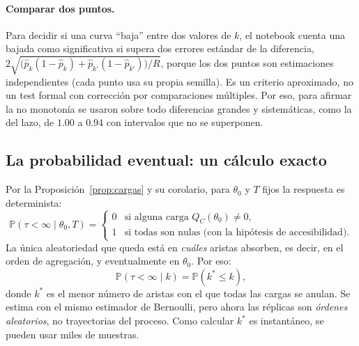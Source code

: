 \documentclass[11pt,a4paper]{article}
\theoremstyle{plain}
\theoremstyle{remark}
\begin{document}
\paragraph{Comparar dos puntos.} Para decidir si una curva ``baja'' entre dos valores de $k$, el notebook cuenta una bajada como significativa si supera dos errores estándar de la diferencia, $2\sqrt{\big(\hat p_k(1-\hat p_k)+\hat p_{k'}(1-\hat p_{k'})\big)/R}$, porque los dos puntos son estimaciones independientes (cada punto usa su propia semilla). Es un criterio aproximado, no un test formal con corrección por comparaciones múltiples. Por eso, para afirmar la no monotonía se usaron sobre todo diferencias grandes y sistemáticas, como la del lazo, de $1.00$ a $0.94$ con intervalos que no se superponen.

\subsection{La probabilidad eventual: un cálculo exacto}\label{sec:fund-exacta}

Por la Proposición~\ref{prop:cargas} y su corolario, para $\theta_0$ y $T$ fijos la respuesta es determinista:
\[
\mathbb{P}(\tau<\infty\mid\theta_0,T)=\begin{cases}0&\text{si alguna carga }Q_C(\theta_0)\ne0,\\1&\text{si todas son nulas (con la hipótesis de accesibilidad).}\end{cases}
\]
La única aleatoriedad que queda está en \emph{cuáles} aristas absorben, es decir, en el orden de agregación, y eventualmente en $\theta_0$. Por eso:
\[
\mathbb{P}(\tau<\infty\mid k)=\mathbb{P}(k^\ast\le k),
\]
donde $k^\ast$ es el menor número de aristas con el que todas las cargas se anulan. Se estima con el mismo estimador de Bernoulli, pero ahora las réplicas son \emph{órdenes aleatorios}, no trayectorias del proceso. Como calcular $k^\ast$ es instantáneo, se pueden usar miles de muestras.
\end{document}
